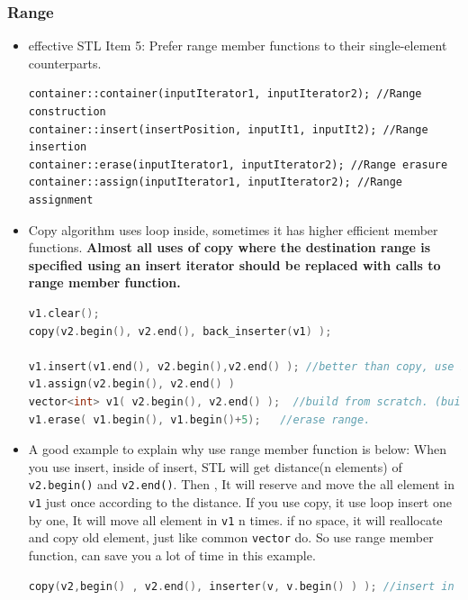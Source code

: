 \documentclass[a4paper,11pt,twoside]{book}
\begin{document}
\subsubsection{Range}

\begin{itemize}
	\item effective STL Item 5: Prefer range member functions to their single-element counterparts.
	
\begin{lstlisting}[numbers=none]
container::container(inputIterator1, inputIterator2); //Range construction
container::insert(insertPosition, inputIt1, inputIt2); //Range insertion
container::erase(inputIterator1, inputIterator2); //Range erasure
container::assign(inputIterator1, inputIterator2); //Range assignment	
\end{lstlisting}	
	

	\item Copy algorithm uses loop inside, sometimes it has higher efficient member functions.  \textbf{Almost all uses of copy where the destination range is specified using an insert iterator should be replaced with calls to range member function.}

\begin{lstlisting}[frame=single, language=c++]
v1.clear();
copy(v2.begin(), v2.end(), back_inserter(v1) );

v1.insert(v1.end(), v2.begin(),v2.end() ); //better than copy, use below 4 fun
v1.assign(v2.begin(), v2.end() )
vector<int> v1( v2.begin(), v2.end() );  //build from scratch. (build range)
v1.erase( v1.begin(), v1.begin()+5);   //erase range.
\end{lstlisting}

	\item A good example to explain why use range member function is below: When you use insert, inside of insert,  STL will get distance(n elements) of \texttt{v2.begin()} and \texttt{v2.end()}. Then , It will reserve and move the all element in \texttt{v1} just once according to the distance.  If you use copy, it use loop insert one by one, It will move all element in \texttt{v1} n times. if no space, it will reallocate and copy old element, just like common \texttt{vector} do. So use range member function, can save you a lot of time in this example.

\begin{lstlisting}[frame=single, language=c++]
copy(v2,begin() , v2.end(), inserter(v, v.begin() ) ); //insert in the begining.


\end{lstlisting}
\end{itemize}
\end{document}
